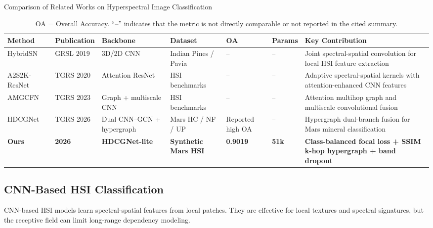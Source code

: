 \documentclass[conference]{IEEEtran}
\begin{document}
\begin{table}[t]
\centering
\caption{Comparison of Related Works on Hyperspectral Image Classification}
\label{tab:related}
\renewcommand{\arraystretch}{1.3}
\begin{tabular}{
    p{2.4cm}
    p{1.8cm}
    p{2.5cm}
    p{2.3cm}
    p{1.2cm}
    p{1.4cm}
    p{3.4cm}
}
\toprule
\textbf{Method} &
\textbf{Publication} &
\textbf{Backbone} &
\textbf{Dataset} &
\textbf{OA} &
\textbf{Params} &
\textbf{Key Contribution} \\
\midrule

HybridSN~\cite{hybridsn} &
GRSL 2019 &
3D/2D CNN &
Indian Pines / Pavia &
-- &
-- &
Joint spectral-spatial convolution for local HSI feature extraction \\

\midrule
A2S2K-ResNet~\cite{a2s2k} &
TGRS 2020 &
Attention ResNet &
HSI benchmarks &
-- &
-- &
Adaptive spectral-spatial kernels with attention-enhanced CNN features \\

\midrule
AMGCFN~\cite{amgcfn} &
TGRS 2023 &
Graph + multiscale CNN &
HSI benchmarks &
-- &
-- &
Attention multihop graph and multiscale convolutional fusion \\

\midrule
HDCGNet~\cite{original_paper} &
TGRS 2026 &
Dual CNN--GCN + hypergraph &
Mars HC / NF / UP &
Reported high OA &
-- &
Hypergraph dual-branch fusion for Mars mineral classification \\

\midrule
\rowcolor{yellow!20}
\textbf{Ours} &
\textbf{2026} &
\textbf{HDCGNet-lite} &
\textbf{Synthetic Mars HSI} &
\textbf{0.9019} &
\textbf{51k} &
\textbf{Class-balanced focal loss + SSIM k-hop hypergraph + band dropout} \\

\bottomrule
\end{tabular}
\vspace{1mm}
\caption*{\small OA = Overall Accuracy. ``--'' indicates that the metric is not directly comparable or not reported in the cited summary.}
\end{table}

\subsection{CNN-Based HSI Classification}
CNN-based HSI models learn spectral-spatial features from local patches. They are effective for local textures and spectral signatures, but the receptive field can limit long-range dependency modeling.
\end{document}
